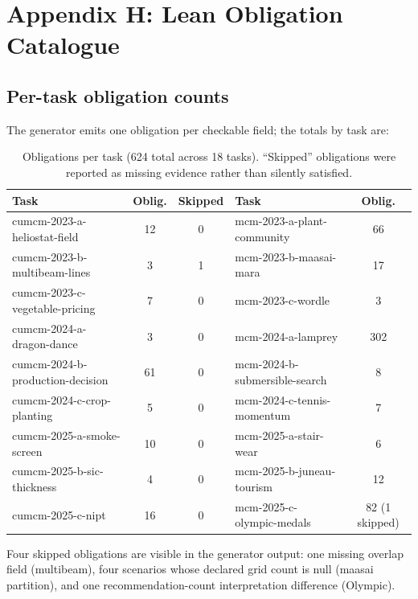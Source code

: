 \section{Appendix H: Lean Obligation Catalogue}
\label{app:lean}

\subsection{Per-task obligation counts}
The generator emits one obligation per checkable field; the totals by task are:

\begin{table}[h]
\centering
\small
\caption{Obligations per task (624 total across 18 tasks). ``Skipped'' obligations were reported as missing evidence rather than silently satisfied.}
\label{tab:lean}
\begin{tabular}{@{}lcclc@{}}
\toprule
Task & Oblig. & Skipped & Task & Oblig. \\
\midrule
cumcm-2023-a-heliostat-field   & 12  & 0 & mcm-2023-a-plant-community   & 66 \\
cumcm-2023-b-multibeam-lines   & 3   & 1 & mcm-2023-b-maasai-mara       & 17 \\
cumcm-2023-c-vegetable-pricing & 7   & 0 & mcm-2023-c-wordle            & 3 \\
cumcm-2024-a-dragon-dance      & 3   & 0 & mcm-2024-a-lamprey           & 302 \\
cumcm-2024-b-production-decision& 61 & 0 & mcm-2024-b-submersible-search& 8 \\
cumcm-2024-c-crop-planting     & 5   & 0 & mcm-2024-c-tennis-momentum   & 7 \\
cumcm-2025-a-smoke-screen      & 10  & 0 & mcm-2025-a-stair-wear        & 6 \\
cumcm-2025-b-sic-thickness     & 4   & 0 & mcm-2025-b-juneau-tourism    & 12 \\
cumcm-2025-c-nipt              & 16  & 0 & mcm-2025-c-olympic-medals    & 82 (1 skipped) \\
\bottomrule
\end{tabular}
\end{table}

Four skipped obligations are visible in the generator output: one missing overlap
field (multibeam), four scenarios whose declared grid count is null (maasai
partition), and one recommendation-count interpretation difference (Olympic).

